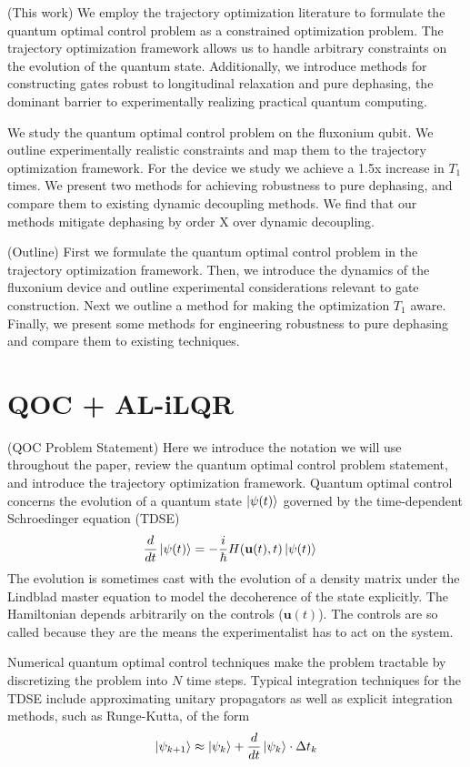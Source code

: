 \documentclass[
  amsfonts,
  amsmath,
  tbtags,
  amssymb,
  aps,
  nobibnotes,
  prl,
  twocolumn,
]{revtex4-2}
\begin{document}
(This work) We employ the trajectory optimization
literature to formulate the quantum
optimal control problem as a constrained optimization problem.
The trajectory optimization framework allows us to handle arbitrary
constraints on the evolution of the quantum state. Additionally,
we introduce methods for constructing gates robust to longitudinal
relaxation and pure dephasing, the dominant barrier to experimentally
realizing practical quantum computing.

We study the quantum optimal control problem on the fluxonium qubit.
We outline experimentally realistic constraints and map them to
the trajectory optimization framework. For the device we study
we achieve a 1.5x increase in $T_{1}$ times.
We present two methods for achieving robustness to pure dephasing,
and compare them to existing dynamic decoupling methods. We find that 
our methods mitigate dephasing by order X over dynamic decoupling.

(Outline)  First we formulate the quantum optimal control problem
in the trajectory optimization framework. Then, we introduce the dynamics
of the fluxonium device and outline experimental considerations
relevant to gate construction. Next we outline a method for
making the optimization $T_{1}$ aware. Finally, we present
some methods for engineering robustness to pure dephasing and
compare them to existing techniques.


\section{QOC + AL-iLQR}
(QOC Problem Statement) Here we introduce the notation
we will use throughout the paper,
review the quantum optimal control problem statement,
and introduce the trajectory optimization framework.
Quantum optimal control concerns the evolution of
a quantum state $\ket{\psi(t)}$ governed by the time-dependent
Schroedinger equation (TDSE)
\begin{align}
  \frac{d}{dt} \ket{\psi(t)} &= -\frac{i}{\hbar} H(\textbf{u}(t), t) \ket{\psi(t)}
\end{align}
The evolution is sometimes cast with the evolution
of a density matrix under the Lindblad master equation to
model the decoherence of the state explicitly. The Hamiltonian
depends arbitrarily on the controls ($\textbf{u}(t)$). The controls
are so called because they are the means the experimentalist has to
act on the system.

Numerical quantum optimal control techniques make
the problem tractable by discretizing the problem into $N$
time steps. Typical integration techniques for the TDSE include
approximating unitary propagators as well as explicit integration methods,
such as Runge-Kutta, of the form
\label{step-approx}
\begin{align}
  \ket{\psi_{k + 1}} \approx \ket{\psi_{k}} + \frac{d}{dt} \ket{\psi_{k}} \cdot \Delta t_{k}
\end{align}
\end{document}
